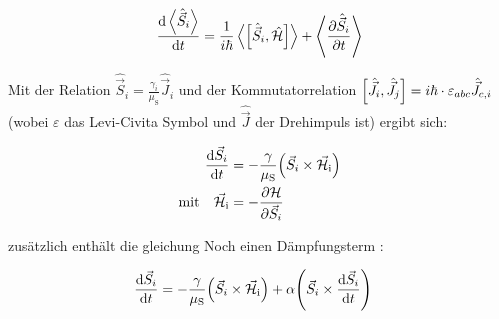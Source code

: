 \documentclass[main.tex]{subfiles}
\begin{document}
\begin{align}
	\dv{\expval{\hat{\vec{S}}_i}}{t} = \frac{1}{i\hbar}
	\expval{\qty[\hat{\vec{S}}_i,
			\hat{\mathcal{H}}]} + \expval{\pdv{\hat{\vec{S}}_i}{t}}
\end{align}


Mit der Relation \(\hat{\vec{S}}_i = \frac{\gamma_i}{\mu_{\text{S}}}
\hat{\vec{J}}_i\) und der Kommutatorrelation \(\qty[\hat{\vec{J}}_i,
	\hat{\vec{J}}_j] = i \hbar \cdot \varepsilon_{abc}
\hat{\vec{J}}_{c,i}\) (wobei
\(\varepsilon\) das Levi-Civita Symbol und \(\hat{\vec{J}}\) der Drehimpuls
ist) ergibt sich:

\begin{align}
	\dv{\vec{S}_i}{t}                             & = -\frac{\gamma
	}{\mu_{\text{S}}}
	\qty(\vec{S}_i \times
	\vec{\mathcal{H}}_{\text{i}})                                   \\
	\text{mit} \quad \vec{\mathcal{H}}_{\text{i}} & = -
	\pdv{\mathcal{H}}{\vec{S}_i}
\end{align}


zusätzlich enthält die gleichung Noch einen Dämpfungsterm
\cite{Gilbert-damping}:

\begin{align}
	\dv{\vec{S}_i}{t} & = -\frac{\gamma }{\mu_{\text{S}}}\qty(\vec{S}_i
	\times
	\vec{\mathcal{H}}_{\text{i}}) + \alpha \qty(\vec{S}_i \times
	\dv{\vec{S}_i}{t})
\end{align}
\end{document}
